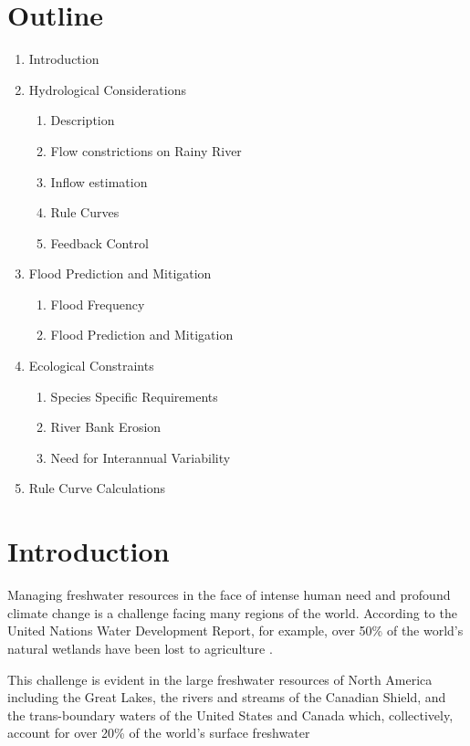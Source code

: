 \documentclass[preprint,times]{elsarticle}
\begin{document}
\section*{Outline}
\begin{enumerate}
    \item Introduction
    \item Hydrological Considerations
    \begin{enumerate}
        \item Description
        \item Flow constrictions on Rainy River
        \item Inflow estimation
        \item Rule Curves
        \item Feedback Control
    \end{enumerate}
    \item Flood Prediction and Mitigation
    \begin{enumerate}
        \item Flood Frequency
        \item Flood Prediction and Mitigation
    \end{enumerate}
    \item Ecological Constraints
    \begin{enumerate}
        \item Species Specific Requirements
        \item River Bank Erosion
        \item Need for Interannual Variability
    \end{enumerate}
    \item Rule Curve Calculations
\end{enumerate}

\section{Introduction}
\noindent

Managing freshwater resources in the face of intense human need and profound climate change is a challenge facing many regions of the world. According to the United Nations Water Development Report, for example, over 50\% of the world's natural wetlands have been lost to agriculture \cite{Verhoeven:2010aa}.


This challenge is evident in the large freshwater resources of North America including the Great Lakes, the rivers and streams of the Canadian Shield, and the trans-boundary waters of the United States and Canada which, collectively, account for over 20\% of the world's surface freshwater
\end{document}

